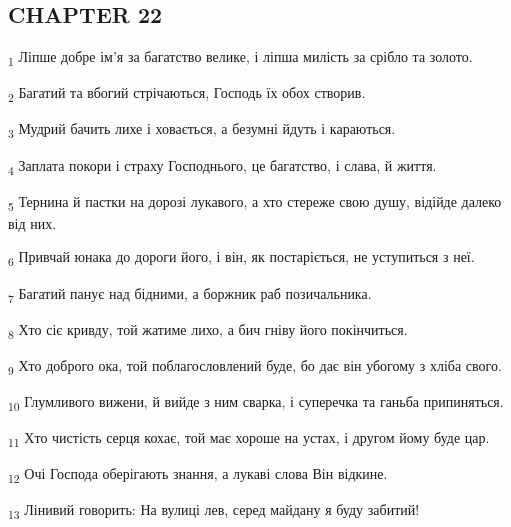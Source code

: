 \subsection{CHAPTER 22}
\begin{tcolorbox}
\textsubscript{1} Ліпше добре ім'я за багатство велике, і ліпша милість за срібло та золото.
\end{tcolorbox}
\begin{tcolorbox}
\textsubscript{2} Багатий та вбогий стрічаються, Господь їх обох створив.
\end{tcolorbox}
\begin{tcolorbox}
\textsubscript{3} Мудрий бачить лихе і ховається, а безумні йдуть і караються.
\end{tcolorbox}
\begin{tcolorbox}
\textsubscript{4} Заплата покори і страху Господнього, це багатство, і слава, й життя.
\end{tcolorbox}
\begin{tcolorbox}
\textsubscript{5} Тернина й пастки на дорозі лукавого, а хто стереже свою душу, відійде далеко від них.
\end{tcolorbox}
\begin{tcolorbox}
\textsubscript{6} Привчай юнака до дороги його, і він, як постаріється, не уступиться з неї.
\end{tcolorbox}
\begin{tcolorbox}
\textsubscript{7} Багатий панує над бідними, а боржник раб позичальника.
\end{tcolorbox}
\begin{tcolorbox}
\textsubscript{8} Хто сіє кривду, той жатиме лихо, а бич гніву його покінчиться.
\end{tcolorbox}
\begin{tcolorbox}
\textsubscript{9} Хто доброго ока, той поблагословлений буде, бо дає він убогому з хліба свого.
\end{tcolorbox}
\begin{tcolorbox}
\textsubscript{10} Глумливого вижени, й вийде з ним сварка, і суперечка та ганьба припиняться.
\end{tcolorbox}
\begin{tcolorbox}
\textsubscript{11} Хто чистість серця кохає, той має хороше на устах, і другом йому буде цар.
\end{tcolorbox}
\begin{tcolorbox}
\textsubscript{12} Очі Господа оберігають знання, а лукаві слова Він відкине.
\end{tcolorbox}
\begin{tcolorbox}
\textsubscript{13} Лінивий говорить: На вулиці лев, серед майдану я буду забитий!
\end{tcolorbox}
